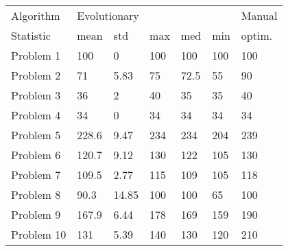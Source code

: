 \begin{tabular}{lllllll}
\toprule
Algorithm & \multicolumn{5}{l}{Evolutionary} & Manual \\
Statistic &         mean &    std &  max &   med &  min & optim. \\
\midrule
Problem 1  &          100 &      0 &  100 &   100 &  100 &    100 \\
Problem 2  &           71 &   5.83 &   75 &  72.5 &   55 &     90 \\
Problem 3  &           36 &      2 &   40 &    35 &   35 &     40 \\
Problem 4  &           34 &      0 &   34 &    34 &   34 &     34 \\
Problem 5  &        228.6 &   9.47 &  234 &   234 &  204 &    239 \\
Problem 6  &        120.7 &   9.12 &  130 &   122 &  105 &    130 \\
Problem 7  &        109.5 &   2.77 &  115 &   109 &  105 &    118 \\
Problem 8  &         90.3 &  14.85 &  100 &   100 &   65 &    100 \\
Problem 9  &        167.9 &   6.44 &  178 &   169 &  159 &    190 \\
Problem 10 &          131 &   5.39 &  140 &   130 &  120 &    210 \\
\bottomrule
\end{tabular}
